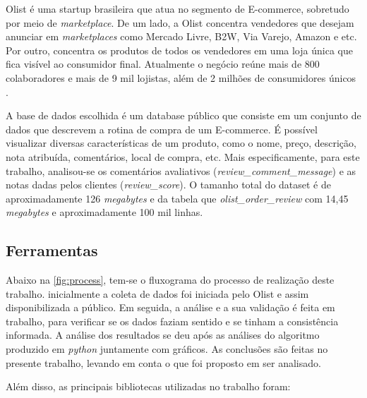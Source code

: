 Olist é uma startup brasileira que atua no segmento de E-commerce, sobretudo por meio de \textit{marketplace}. De um lado, a Olist concentra vendedores que desejam anunciar em \textit{marketplaces} como Mercado Livre, B2W, Via Varejo, Amazon e etc. Por outro, concentra os produtos de todos os vendedores em uma loja única que fica visível ao consumidor final. Atualmente o negócio reúne mais de 800 colaboradores e mais de 9 mil lojistas, além de 2 milhões de consumidores únicos \citep{Olist}.

A base de dados escolhida é um database público que consiste em um conjunto de dados que descrevem a rotina de compra de um E-commerce. É possível visualizar diversas características de um produto, como o nome, preço, descrição, nota atribuída, comentários, local de compra, etc. Mais especificamente, para este trabalho, analisou-se os comentários avaliativos (\textit{review\_comment\_message}) e as notas dadas pelos clientes (\textit{review\_score}). O tamanho total do dataset é de aproximadamente 126 \textit{megabytes} e da tabela que \textit{olist\_order\_review} com  14,45 \textit{megabytes} e aproximadamente 100 mil linhas.

\subsection{Ferramentas}

Abaixo na \autoref{fig:process}, tem-se o fluxograma do processo de realização deste trabalho. inicialmente a coleta de dados foi iniciada pelo Olist e assim disponibilizada a público. Em seguida, a análise e a sua validação é feita em trabalho, para verificar se os dados faziam sentido e se tinham a consistência informada. A análise dos resultados se deu após as análises do algoritmo produzido em \textit{python} juntamente com gráficos. As conclusões são feitas no presente trabalho, levando em conta o que foi proposto em ser analisado.

Além disso, as principais bibliotecas utilizadas no trabalho foram:

